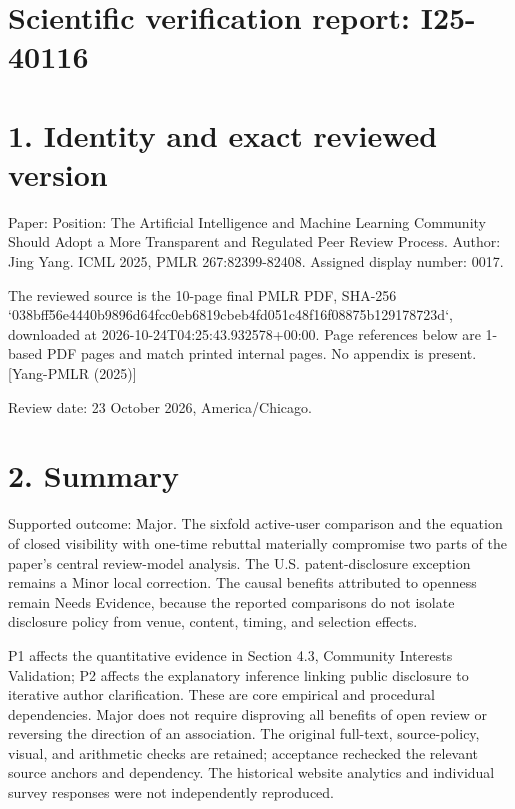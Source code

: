 \documentclass[10pt]{article}
\begin{document}
\section*{Scientific verification report: I25-40116}
\section*{1. Identity and exact reviewed version}
Paper: Position: The Artificial Intelligence and Machine Learning Community Should Adopt a More Transparent and Regulated Peer Review Process. Author: Jing Yang. ICML 2025, PMLR 267:82399-82408. Assigned display number: 0017.\par
The reviewed source is the 10-page final PMLR PDF, SHA-256 `038bff56e4440b9896d64fcc0eb6819cbeb4fd051c48f16f08875b129178723d`, downloaded at 2026-10-24T04:25:43.932578+00:00. Page references below are 1-based PDF pages and match printed internal pages. No appendix is present. [Yang-PMLR (2025)]\par
Review date: 23 October 2026, America/Chicago.\par
\section*{2. Summary}
Supported outcome: Major. The sixfold active-user comparison and the equation of closed visibility with one-time rebuttal materially compromise two parts of the paper’s central review-model analysis. The U.S. patent-disclosure exception remains a Minor local correction. The causal benefits attributed to openness remain Needs Evidence, because the reported comparisons do not isolate disclosure policy from venue, content, timing, and selection effects.\par
P1 affects the quantitative evidence in Section 4.3, Community Interests Validation; P2 affects the explanatory inference linking public disclosure to iterative author clarification. These are core empirical and procedural dependencies. Major does not require disproving all benefits of open review or reversing the direction of an association. The original full-text, source-policy, visual, and arithmetic checks are retained; acceptance rechecked the relevant source anchors and dependency. The historical website analytics and individual survey responses were not independently reproduced.\par
\end{document}
